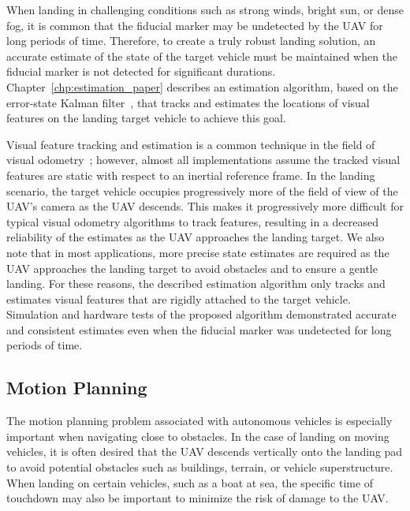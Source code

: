 When landing in challenging conditions such as strong winds, bright sun, or
dense fog, it is common that the fiducial marker may be undetected by the UAV
for long periods of time.
Therefore, to create a truly robust landing solution, an accurate estimate of
the state of the target vehicle must be maintained when the fiducial marker is
not detected for significant durations.
Chapter~\ref{chp:estimation_paper}
describes an estimation algorithm, based on the error-state Kalman
filter~\cite{roumeliotis1999circumventing}, that tracks and estimates the locations of
visual features on the landing target vehicle to achieve this goal.

Visual feature
tracking and estimation is a common technique in the field of visual
odometry~\cite{qin2018vins}; however, almost all implementations assume the
tracked visual features are static with respect to an inertial reference frame.
In the landing scenario, the target vehicle occupies progressively more of the
field of view of the UAV's camera as the UAV descends. This makes it progressively
more difficult for typical visual odometry algorithms to track features,
resulting in a decreased
reliability of the estimates as the UAV approaches the landing target.
We also note that in most
applications, more precise state estimates are required as the UAV
approaches
the landing target to avoid obstacles and to ensure a gentle landing.
For these reasons, the described estimation algorithm
only tracks and estimates visual features that are rigidly attached to the
target vehicle.
Simulation and hardware tests of the proposed algorithm demonstrated accurate and consistent estimates
even when the fiducial marker was undetected
for long periods of time.

\subsection{Motion Planning}
The motion planning problem associated with autonomous vehicles is especially
important when 
navigating close to obstacles. In the case of landing on moving vehicles, it is
often desired that the UAV descends vertically onto the landing pad to avoid
potential obstacles such as buildings, terrain, or vehicle superstructure.
When landing on certain vehicles, such as a boat at sea, the specific time of
touchdown may also be important to minimize the risk of damage to the UAV.

